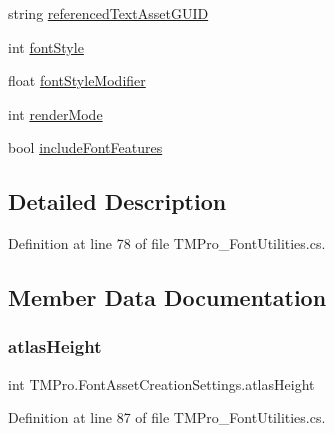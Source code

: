\begin{DoxyCompactItemize}
\item 
string \mbox{\hyperlink{struct_t_m_pro_1_1_font_asset_creation_settings_aa6a1f65bed937cfc8a6b349a7f5e590c}{referenced\+Text\+Asset\+G\+U\+ID}}
\item 
int \mbox{\hyperlink{struct_t_m_pro_1_1_font_asset_creation_settings_a5da6d4456b9a4f3f7aa7544deeedf3d7}{font\+Style}}
\item 
float \mbox{\hyperlink{struct_t_m_pro_1_1_font_asset_creation_settings_a22cb54befa159e56cfd446cfe168fa05}{font\+Style\+Modifier}}
\item 
int \mbox{\hyperlink{struct_t_m_pro_1_1_font_asset_creation_settings_a09dafd38b599eddf47aee194a9d0fd32}{render\+Mode}}
\item 
bool \mbox{\hyperlink{struct_t_m_pro_1_1_font_asset_creation_settings_afe2a3e770cef27475e426bf6b3043d82}{include\+Font\+Features}}
\end{DoxyCompactItemize}


\subsection{Detailed Description}


Definition at line 78 of file T\+M\+Pro\+\_\+\+Font\+Utilities.\+cs.



\subsection{Member Data Documentation}
\mbox{\label{struct_t_m_pro_1_1_font_asset_creation_settings_a61efaa2cb1ade42549ae6b9e358aa20c}} 
\subsubsection{\texorpdfstring{atlasHeight}{atlasHeight}}
{\footnotesize\ttfamily int T\+M\+Pro.\+Font\+Asset\+Creation\+Settings.\+atlas\+Height}



Definition at line 87 of file T\+M\+Pro\+\_\+\+Font\+Utilities.\+cs.

\mbox{\label{struct_t_m_pro_1_1_font_asset_creation_settings_af3d6fda766d7b2e538de511f69f3c4f6}} 
